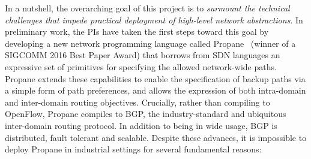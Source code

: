 In a nutshell, the overarching goal of this project is to {\em surmount the technical challenges that impede practical deployment of high-level network abstractions}.  In preliminary work, 
the PIs have taken the first steps toward this goal by developing a
new network programming language called Propane~\cite{beckett+:propane} (winner of a SIGCOMM 2016
Best Paper Award) that borrows from SDN languages an expressive set of primitives for specifying the allowed network-wide paths.  Propane extends these capabilities to enable the specification of backup paths via a simple form of path preferences, and allows the expression of both intra-domain 
and inter-domain routing objectives.  Crucially, rather than compiling to OpenFlow,
Propane compiles to BGP, the industry-standard and ubiquitous inter-domain routing protocol.  In addition to being in wide usage, BGP is distributed, fault tolerant and scalable.
Despite these advances, it is impossible to deploy Propane in industrial settings for several fundamental reasons:



